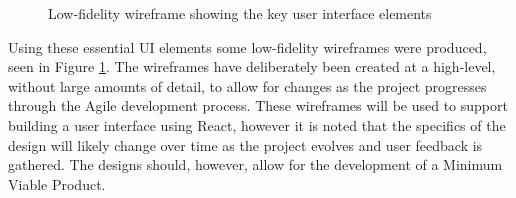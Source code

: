 \begin{figure}[h!]
  \centering
  \caption{Low-fidelity wireframe showing the key user interface elements}
  \label{fig:ui-wireframes}
\end{figure}

Using these essential UI elements some low-fidelity wireframes were produced, seen in Figure \ref{fig:ui-wireframes}. The wireframes have deliberately been created at a high-level, without large amounts of detail, to allow for changes as the project progresses through the Agile development process. These wireframes will be used to support building a user interface using React, however it is noted that the specifics of the design will likely change over time as the project evolves and user feedback is gathered. The designs should, however, allow for the development of a Minimum Viable Product.
